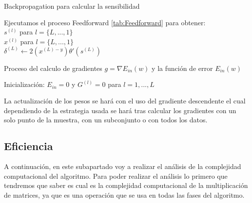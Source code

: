 \begin{algorithm}
   \caption{Backpropagation para calcular la sensibilidad}
   Ejecutamos el proceso Feedforward \ref{tab:Feedforward} para obtener:\\
   $s^{(l)}$ para $l = \{L,...,1\}$ \\
   $x^{(l)}$ para $l = \{L,...,1\}$ \\  
   $\delta^{(L)} \gets 2(x^{(L)-y})\theta'(s^{(L)})$ \\
   
   \label{tab:Backprop_alg}
\end{algorithm}

\begin{algorithm}
   \caption{Proceso del calculo de gradientes $g = \nabla E_{in}(w)$ y la función de error $E_{in}(w)$}
   Inicialización: $E_{in} = 0$ y $G^{(l)} = 0 $ para $l = 1,...,L$ \\
\end{algorithm}

La actualización de los pesos se hará con el uso del gradiente descendente el cual dependiendo de la estrategia usada se hará tras calcular los gradientes con un solo punto de la muestra, con un subconjunto o con todos los datos.

\subsection{Eficiencia}

A continuación, en este subapartado voy a realizar el análisis de la complejidad computacional del algoritmo. Para poder realizar el análisis lo primero que tendremos que saber es cual es la complejidad computacional de la multiplicación de matrices, ya que es una operación que se usa en todas las fases del algoritmo.

